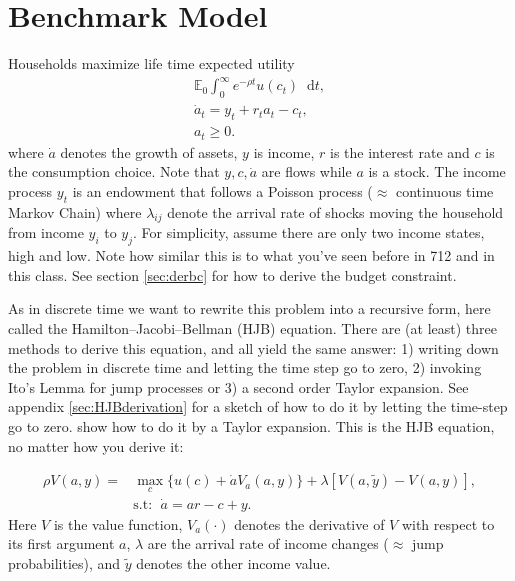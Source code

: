 \documentclass[12pt]{article}
\newcommand{\E}{\mathbb{E}}
\DeclareMathOperator{\1}{\mathbbm{1}}
\newcommand*\diff{\mathop{}\!\mathrm{d}}
\begin{document}
\section{Benchmark Model}
Households maximize life time expected utility
\begin{align}
\E_0 \int_0^\infty e^{-\rho t} u(c_t) \diff t, \\
\dot a_t = y_t + r_t a_t - c_t, \\
a_t\ge 0.
\end{align}
where $\dot a$ denotes the growth of assets, $y$ is income, $r$ is the interest rate and $c$ is the consumption choice. Note that $y,c,\dot a$ are flows while $a$ is a stock. The income process $y_t$ is an endowment that follows a Poisson process ($\approx$ continuous time Markov Chain) where $\lambda_{ij}$ denote the arrival rate of shocks moving the household from income $y_i$ to $y_j$. For simplicity, assume there are only two income states, high and low. Note how similar this is to what you've seen before in 712 and in this class. See section \ref{sec:derbc} for how to derive the budget constraint. 

As in discrete time we want to rewrite this problem into a recursive form, here called the Hamilton–Jacobi–Bellman (HJB) equation. There are (at least) three methods to derive this equation, and all yield the same answer: 1) writing down the problem in discrete time and letting the time step go to zero, 2) invoking Ito's Lemma for jump processes or 3) a second order Taylor expansion. See appendix \ref{sec:HJBderivation} for a sketch of how to do it by letting the time-step go to zero. \cite{Barczyk2017} show how to do it by a Taylor expansion. This is {the} HJB equation, no matter how you derive it:

\begin{align}\label{eq:HJB}
\rho V(a,y) =& \max_{c} \big\{ u(c) + \dot a V_a(a,y) \big\} + \lambda [V(a,\tilde y) - V(a,y)],\\
&\text{s.t: }\; \dot a = a r - c + y.
\end{align}
Here $V$ is the value function, $V_a(\cdot)$ denotes the derivative of $V$ with respect to its first argument $a$, $\lambda$ are the arrival rate of income changes ($\approx$ jump probabilities), and $\tilde y$ denotes the other income value.
\end{document}

